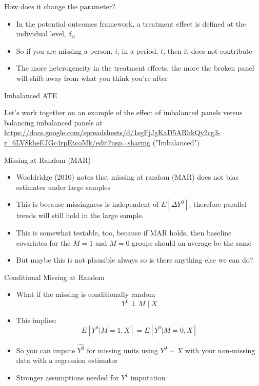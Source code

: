 \documentclass{beamer}
\begin{document}
\begin{frame}{How does it change the parameter?}

\begin{itemize}
\item In the potential outcomes framework, a treatment effect is defined at the individual level, $\delta_{it}$
\item So if you are missing a person, $i$,  in a period, $t$, then it does not contribute
\item The more heterogeneity in the treatment effects, the more the broken panel will shift away from what you think you're after
\end{itemize}

\end{frame}


\begin{frame}{Imbalanced ATE}

Let's work together on an example of the effect of imbalanced panels versus balancing imbalanced panels at \url{https://docs.google.com/spreadsheets/d/1sgFjJgKaD5ARhkQy2cg3-r_6LV8kheEJGc4rpEtcoMk/edit?usp=sharing} ("Imbalanced")

\end{frame}

\begin{frame}{Missing at Random (MAR)}
  \begin{itemize}
    \item Wooldridge (2010) notes that missing at random (MAR) does not bias estimates under large samples
    \item This is because missingness is independent of $E[\Delta Y^0]$, therefore parallel trends will still hold in the large sample.
    \item This is somewhat testable, too, because if MAR holds, then baseline covariates for the $M=1$ and $M=0$ groups should on average be the same 
    \item But maybe this is not plausible always so is there anything else we can do?
  \end{itemize}
\end{frame}


\begin{frame}{Conditional Missing at Random}
  \begin{itemize}
	\item What if the missing is conditionally random $$Y^0  \perp M \mid X$$
    \item This implies:
    $$E[Y^0|M=1,X] = E[Y^0|M=0,X]$$
	\item So you can impute $\widehat{Y^0}$ for missing units using $Y^0 \sim X$ with your non-missing data with a regression estimator
	\item Stronger assumptions needed for $Y^1$ imputation 
  \end{itemize}
\end{frame}
\end{document}
